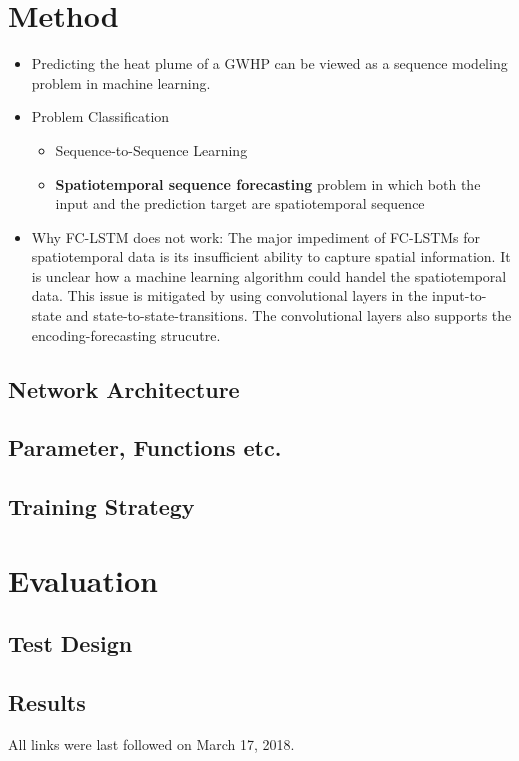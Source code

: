\documentclass[
  a4paper,  %
  twoside,  %
  bibliography=totoc,
  headsepline,
  cleardoublepage=empty,
  parskip=half,
  draft=false
]{scrbook}
\begin{document}
\chapter{Method}
\begin{itemize}
    \item Predicting the heat plume of a GWHP can be viewed as a sequence modeling problem in machine learning.
    \item Problem Classification
    \begin{itemize}
        \item Sequence-to-Sequence Learning \cite{sutskever2014sequence}
        \item \textbf{Spatiotemporal sequence forecasting} problem in which both the input and the prediction target are spatiotemporal sequence \cite{ShiConvLSTMPrecipitation}
    \end{itemize}
    \item Why FC-LSTM does not work: \newline
    The major impediment of FC-LSTMs for spatiotemporal data is its insufficient ability to capture spatial information. 
    It is unclear how a machine learning algorithm could handel the spatiotemporal data.
    This issue is mitigated by using convolutional layers in the input-to-state and state-to-state-transitions. 
    The convolutional layers also supports the encoding-forecasting strucutre. 
\end{itemize}

\section{Network Architecture}

\section{Parameter, Functions etc.}
\section{Training Strategy}

\chapter{Evaluation}
\section{Test Design}
\section{Results}



\printbibliography

All links were last followed on March 17, 2018.

\appendix


\pagestyle{empty}
\renewcommand*{\chapterpagestyle}{empty}
\Versicherung
\end{document}

